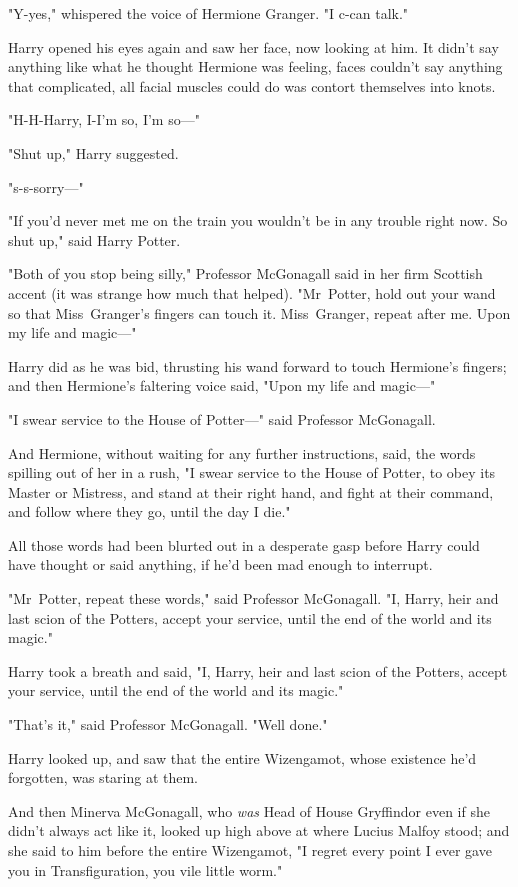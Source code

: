 "Y-yes," whispered the voice of Hermione Granger. "I c-can talk."

Harry opened his eyes again and saw her face, now looking at him. It didn't say
anything like what he thought Hermione was feeling, faces couldn't say anything
that complicated, all facial muscles could do was contort themselves into knots.

"H-H-Harry, I-I'm so, I'm so—"

"Shut up," Harry suggested.

"s-s-sorry—"

"If you'd never met me on the train you wouldn't be in any trouble right now.
So shut up," said Harry Potter.

"Both of you stop being silly," Professor McGonagall said in her firm Scottish
accent (it was strange how much that helped). "Mr~Potter, hold out your wand
so that Miss~Granger's fingers can touch it. Miss~Granger, repeat after me.
Upon my life and magic—"

Harry did as he was bid, thrusting his wand forward to touch Hermione's
fingers; and then Hermione's faltering voice said, "Upon my life and magic—"

"I swear service to the House of Potter—" said Professor McGonagall.

And Hermione, without waiting for any further instructions, said, the words
spilling out of her in a rush, "I swear service to the House of Potter, to obey
its Master or Mistress, and stand at their right hand, and fight at their
command, and follow where they go, until the day I die."

All those words had been blurted out in a desperate gasp before Harry could
have thought or said anything, if he'd been mad enough to interrupt.

"Mr~Potter, repeat these words," said Professor McGonagall. "I, Harry, heir
and last scion of the Potters, accept your service, until the end of the world
and its magic."

Harry took a breath and said, "I, Harry, heir and last scion of the Potters,
accept your service, until the end of the world and its magic."

"That's it," said Professor McGonagall. "Well done."

Harry looked up, and saw that the entire Wizengamot, whose existence he'd
forgotten, was staring at them.

And then Minerva McGonagall, who \emph{was} Head of House Gryffindor even if
she didn't always act like it, looked up high above at where Lucius Malfoy
stood; and she said to him before the entire Wizengamot, "I regret every point
I ever gave you in Transfiguration, you vile little worm."

